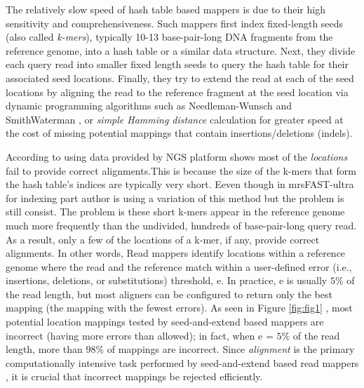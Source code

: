 The relatively slow speed of hash table based mappers is due to their high sensitivity and comprehensiveness. Such mappers first index fixed-length seeds (also called \emph{k-mers}), typically 10-13 base-pair-long DNA fragments from the reference genome, into a hash table or a similar data structure. Next, they divide each query read into smaller fixed length seeds to query the hash table for their associated seed locations. Finally, they try to extend the read at each of the seed locations by aligning the read to the reference fragment at the seed location via dynamic programming algorithms such as Needleman-Wunsch \cite{needleman} and SmithWaterman \cite{smith1981identification}, or \emph{simple Hamming distance} calculation for greater speed at the cost of missing potential mappings that contain insertions/deletions (indels).

According to \cite{fasthash} using data provided by NGS platform shows most of the \textit{locations} fail to provide correct alignments.This is because the size of the k-mers that form the hash table’s indices are typically very short. Eeven though in mrsFAST-ultra\cite{mrsfastultra} for indexing part author is using a variation of this method but the problem is still consist. The problem is these short k-mers appear in the reference genome much more frequently than the undivided, hundreds of base-pair-long query read. As a result, only a few of the locations of a k-mer, if any, provide correct alignments. In other words, Read mappers identify locations within a reference genome where the read and the reference match within a user-defined error (i.e., insertions, deletions, or substitutions) threshold, e. In practice, e is usually $5\%$ of the read length, but most aligners can be configured to return only the best mapping (the mapping with the fewest errors). As seen in Figure \ref{fig:fig1} \cite{shd}, most potential location mappings tested by seed-and-extend based mappers are incorrect (having more errors than allowed); in fact, when e = $5\%$ of the read length, more than $98\%$ of mappings are incorrect. Since \emph{alignment} is the primary computationally intensive task performed by seed-and-extend based read mappers \cite{fasthash}, it is crucial that incorrect mappings be rejected efficiently. 
